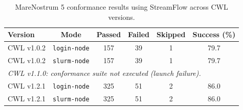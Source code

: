 \documentclass{article}
\begin{document}
\begin{table}[ht!]
\centering
\renewcommand{\arraystretch}{1.2}
\setlength{\tabcolsep}{6pt}
\begin{tabular}{|l|c|c|c|c|c|}
\hline
\rowcolor{lightgray!50}
\textbf{Version} & \textbf{Mode} & \textbf{Passed} & \textbf{Failed} & \textbf{Skipped} & \textbf{Success (\%)} \\
\hline
CWL v1.0.2 & \texttt{login-node} & 157 & 39 & 1 & 79.7 \\ \hline
CWL v1.0.2 & \texttt{slurm-node} & 157 & 39 & 1 & 79.7 \\ \hline
\hline
\multicolumn{6}{|l|}{\textit{CWL v1.1.0: conformance suite not executed (launch failure).}} \\ \hline
\hline
CWL v1.2.1 & \texttt{login-node} & 325 & 51 & 2 & 86.0 \\ \hline
CWL v1.2.1 & \texttt{slurm-node} & 325 & 51 & 2 & 86.0 \\ \hline
\hline
\end{tabular}
\caption{MareNostrum 5 conformance results using StreamFlow across CWL versions.}
\end{table}
\end{document}
